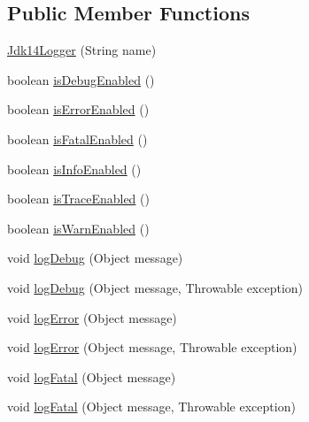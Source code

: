 \subsection*{Public Member Functions}
\begin{DoxyCompactItemize}
\item 
\mbox{\hyperlink{classcom_1_1mysql_1_1jdbc_1_1log_1_1_jdk14_logger_ad663d870bdbd73c02ea65bbe920d5131}{Jdk14\+Logger}} (String name)
\item 
boolean \mbox{\hyperlink{classcom_1_1mysql_1_1jdbc_1_1log_1_1_jdk14_logger_ad924ecc59554c92596222f2952d5d65c}{is\+Debug\+Enabled}} ()
\item 
boolean \mbox{\hyperlink{classcom_1_1mysql_1_1jdbc_1_1log_1_1_jdk14_logger_af21aea05fb62e1895801a086bf33c2f6}{is\+Error\+Enabled}} ()
\item 
boolean \mbox{\hyperlink{classcom_1_1mysql_1_1jdbc_1_1log_1_1_jdk14_logger_a3cf7110392bc00771a85b3e99b8841af}{is\+Fatal\+Enabled}} ()
\item 
boolean \mbox{\hyperlink{classcom_1_1mysql_1_1jdbc_1_1log_1_1_jdk14_logger_aeab4dbb0e0a551d27dfd1b9bd6df5322}{is\+Info\+Enabled}} ()
\item 
boolean \mbox{\hyperlink{classcom_1_1mysql_1_1jdbc_1_1log_1_1_jdk14_logger_a02f8d0f49784473a5c5250184001091a}{is\+Trace\+Enabled}} ()
\item 
boolean \mbox{\hyperlink{classcom_1_1mysql_1_1jdbc_1_1log_1_1_jdk14_logger_a70b246a328418f6a6f380b8f839fdf44}{is\+Warn\+Enabled}} ()
\item 
void \mbox{\hyperlink{classcom_1_1mysql_1_1jdbc_1_1log_1_1_jdk14_logger_a0eacb4fd20d546869f80b5ecd9e8998c}{log\+Debug}} (Object message)
\item 
void \mbox{\hyperlink{classcom_1_1mysql_1_1jdbc_1_1log_1_1_jdk14_logger_a83874be2dc0c2bf71b731e7ef5115a69}{log\+Debug}} (Object message, Throwable exception)
\item 
void \mbox{\hyperlink{classcom_1_1mysql_1_1jdbc_1_1log_1_1_jdk14_logger_ac1c3bf70b677a9fb3a47415201d6fead}{log\+Error}} (Object message)
\item 
void \mbox{\hyperlink{classcom_1_1mysql_1_1jdbc_1_1log_1_1_jdk14_logger_a50ddfb22be744767635555b7d28333ff}{log\+Error}} (Object message, Throwable exception)
\item 
void \mbox{\hyperlink{classcom_1_1mysql_1_1jdbc_1_1log_1_1_jdk14_logger_a38b5dd14e2ef24972f6a7bda99231544}{log\+Fatal}} (Object message)
\item 
void \mbox{\hyperlink{classcom_1_1mysql_1_1jdbc_1_1log_1_1_jdk14_logger_adc559d153307c03a7d032eed1fbc092d}{log\+Fatal}} (Object message, Throwable exception)

\end{DoxyCompactItemize}
